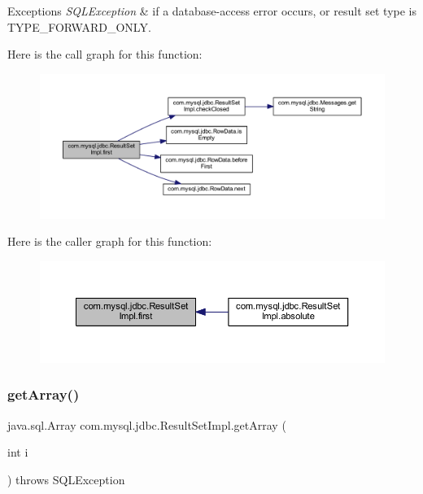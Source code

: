 \begin{DoxyExceptions}{Exceptions}
{\em S\+Q\+L\+Exception} & if a database-\/access error occurs, or result set type is T\+Y\+P\+E\+\_\+\+F\+O\+R\+W\+A\+R\+D\+\_\+\+O\+N\+LY. \\
\hline
\end{DoxyExceptions}
Here is the call graph for this function\+:
\nopagebreak
\begin{figure}[H]
\begin{center}
\leavevmode
\includegraphics[width=350pt]{classcom_1_1mysql_1_1jdbc_1_1_result_set_impl_ad95952bb64306d825909c08271282c6f_cgraph}
\end{center}
\end{figure}
Here is the caller graph for this function\+:
\nopagebreak
\begin{figure}[H]
\begin{center}
\leavevmode
\includegraphics[width=350pt]{classcom_1_1mysql_1_1jdbc_1_1_result_set_impl_ad95952bb64306d825909c08271282c6f_icgraph}
\end{center}
\end{figure}
\mbox{\label{classcom_1_1mysql_1_1jdbc_1_1_result_set_impl_a6b06205205974e4964705258ce1c90df}} 
\subsubsection{\texorpdfstring{get\+Array()}{getArray()}\hspace{0.1cm}{\footnotesize\ttfamily [1/2]}}
{\footnotesize\ttfamily java.\+sql.\+Array com.\+mysql.\+jdbc.\+Result\+Set\+Impl.\+get\+Array (\begin{DoxyParamCaption}\item[{int}]{i }\end{DoxyParamCaption}) throws S\+Q\+L\+Exception}

